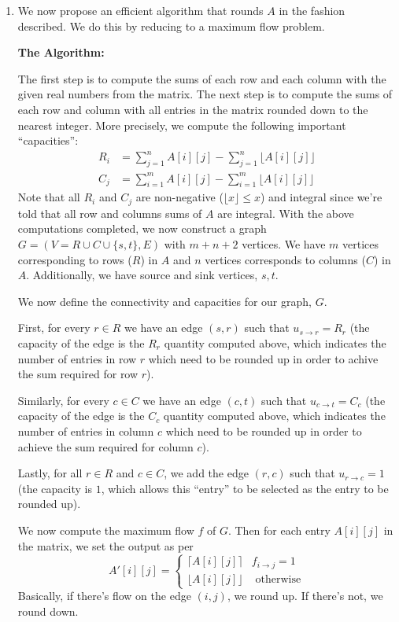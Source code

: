 \documentclass[12pt]{exam}
\newcommand{\Q}[1]{\question{\large{\textbf{#1}}}}
\begin{document}
\begin{questions}
\newpage
\Q{Problem 4}
\begin{solution}
  \begin{enumerate}[label=(\alph*)]
    \item We now propose an efficient algorithm that rounds $A$ in the fashion described. We do this by reducing to a maximum flow problem.

    \textbf{The Algorithm:}

    The first step is to compute the sums of each row and each column with the given real numbers from the matrix. The next step is to compute the sums of each row and column with all entries in the matrix rounded down to the nearest integer. More precisely, we compute the following important ``capacities'':
    \begin{align*}
      R_i &= \sum_{j = 1}^n A[i][j] - \sum_{j = 1}^n \lfloor A[i][j] \rfloor  \\ 
      C_j &= \sum_{i = 1}^m A[i][j] - \sum_{i = 1}^m \lfloor A[i][j] \rfloor
    \end{align*}
    Note that all $R_i$ and $C_j$ are non-negative ($\lfloor x \rfloor \leq x$) and integral since we're told that all row and columns sums of $A$ are integral. With the above computations completed, we now construct a graph $G = (V = R \cup C \cup \{s,t\},E)$ with $m + n + 2$ vertices. We have $m$ vertices corresponding to rows ($R$) in $A$ and $n$ vertices corresponds to columns ($C$) in $A$. Additionally, we have source and sink vertices, $s,t$.

    We now define the connectivity and capacities for our graph, $G$.

    First, for every $r \in R$ we have an edge $(s, r)$ such that $u_{s \to r} = R_r$ (the capacity of the edge is the $R_r$ quantity computed above, which indicates the number of entries in row $r$ which need to be rounded up in order to achive the sum required for row $r$).

    Similarly, for every $c \in C$ we have an edge $(c, t)$ such that $u_{c \to t} = C_c$ (the capacity of the edge is the $C_c$ quantity computed above, which indicates the number of entries in column $c$ which need to be rounded up in order to achieve the sum required for column $c$).

    Lastly, for all $r \in R$ and $c \in C$, we add the edge $(r,c)$ such that $u_{r \to c} = 1$ (the capacity is $1$, which allows this ``entry'' to be selected as the entry to be rounded up).

    We now compute the maximum flow $f$ of $G$. Then for each entry $A[i][j]$ in the matrix, we set the output as per
    \[
      A'[i][j] = \begin{cases}
        \lceil A[i][j] \rceil & f_{i \to j} = 1 \\
        \lfloor A[i][j] \rfloor & \text{ otherwise}
      \end{cases}
    \]
    Basically, if there's flow on the edge $(i,j)$, we round up. If there's not, we round down.


\end{enumerate}
\end{solution}
\end{questions}
\end{document}
